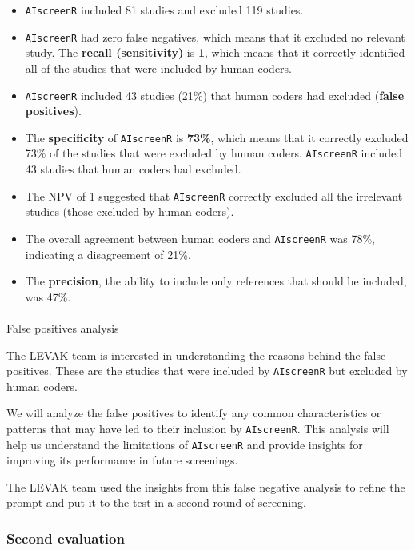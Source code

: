 \documentclass[
  letterpaper,
  DIV=11,
  numbers=noendperiod]{scrartcl}
\makeatletter
\let\oldparagraph\paragraph
\renewcommand{\paragraph}{
    \@ifstar
      \xxxParagraphStar
      \xxxParagraphNoStar
  }
\newcommand{\xxxParagraphStar}[1]{\oldparagraph*{#1}\mbox{}}
\newcommand{\xxxParagraphNoStar}[1]{\oldparagraph{#1}\mbox{}}
\makeatother
\begin{document}
\begin{itemize}
\item
  \texttt{AIscreenR} included 81 studies and excluded 119 studies.
\item
  \texttt{AIscreenR} had zero false negatives, which means that it
  excluded no relevant study. The \textbf{recall (sensitivity)} is
  \textbf{1}, which means that it correctly identified all of the
  studies that were included by human coders.
\item
  \texttt{AIscreenR} included 43 studies (21\%) that human coders had
  excluded (\textbf{false positives}).
\item
  The \textbf{specificity} of \texttt{AIscreenR} is \textbf{73\%}, which
  means that it correctly excluded 73\% of the studies that were
  excluded by human coders. \texttt{AIscreenR} included 43 studies that
  human coders had excluded.
\item
  The NPV of 1 suggested that \texttt{AIscreenR} correctly excluded all
  the irrelevant studies (those excluded by human coders).
\item
  The overall agreement between human coders and \texttt{AIscreenR} was
  78\%, indicating a disagreement of 21\%.
\item
  The \textbf{precision}, the ability to include only references that
  should be included, was 47\%.
\end{itemize}

\paragraph{False positives analysis}\label{false-positives-analysis}

The LEVAK team is interested in understanding the reasons behind the
false positives. These are the studies that were included by
\texttt{AIscreenR} but excluded by human coders.

We will analyze the false positives to identify any common
characteristics or patterns that may have led to their inclusion by
\texttt{AIscreenR}. This analysis will help us understand the
limitations of \texttt{AIscreenR} and provide insights for improving its
performance in future screenings.

The LEVAK team used the insights from this false negative analysis to
refine the prompt and put it to the test in a second round of screening.

\subsubsection{Second evaluation}\label{second-evaluation}
\end{document}
